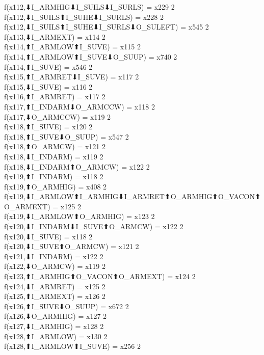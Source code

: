 f(x112,⬇I_ARMHIG⬇I_SUILS⬇I_SURLS) = x229 {2} \\
f(x112,⬇I_SUILS⬆I_SUHE⬇I_SURLS) = x228 {2} \\
f(x112,⬇I_SUILS⬆I_SUHE⬇I_SURLS⬇O_SULEFT) = x545 {2} \\
f(x113,⬇I_ARMEXT) = x114 {2} \\
f(x114,⬆I_ARMLOW⬆I_SUVE) = x115 {2} \\
f(x114,⬆I_ARMLOW⬆I_SUVE⬇O_SUUP) = x740 {2} \\
f(x114,⬆I_SUVE) = x546 {2} \\
f(x115,⬆I_ARMRET⬇I_SUVE) = x117 {2} \\
f(x115,⬇I_SUVE) = x116 {2} \\
f(x116,⬆I_ARMRET) = x117 {2} \\
f(x117,⬆I_INDARM⬇O_ARMCCW) = x118 {2} \\
f(x117,⬇O_ARMCCW) = x119 {2} \\
f(x118,⬆I_SUVE) = x120 {2} \\
f(x118,⬆I_SUVE⬇O_SUUP) = x547 {2} \\
f(x118,⬆O_ARMCW) = x121 {2} \\
f(x118,⬇I_INDARM) = x119 {2} \\
f(x118,⬇I_INDARM⬆O_ARMCW) = x122 {2} \\
f(x119,⬆I_INDARM) = x118 {2} \\
f(x119,⬆O_ARMHIG) = x408 {2} \\
f(x119,⬇I_ARMLOW⬆I_ARMHIG⬇I_ARMRET⬆O_ARMHIG⬆O_VACON⬆O_ARMEXT) = x125 {2} \\
f(x119,⬇I_ARMLOW⬆O_ARMHIG) = x123 {2} \\
f(x120,⬇I_INDARM⬇I_SUVE⬆O_ARMCW) = x122 {2} \\
f(x120,⬇I_SUVE) = x118 {2} \\
f(x120,⬇I_SUVE⬆O_ARMCW) = x121 {2} \\
f(x121,⬇I_INDARM) = x122 {2} \\
f(x122,⬇O_ARMCW) = x119 {2} \\
f(x123,⬆I_ARMHIG⬆O_VACON⬆O_ARMEXT) = x124 {2} \\
f(x124,⬇I_ARMRET) = x125 {2} \\
f(x125,⬆I_ARMEXT) = x126 {2} \\
f(x126,⬆I_SUVE⬇O_SUUP) = x672 {2} \\
f(x126,⬇O_ARMHIG) = x127 {2} \\
f(x127,⬇I_ARMHIG) = x128 {2} \\
f(x128,⬆I_ARMLOW) = x130 {2} \\
f(x128,⬆I_ARMLOW⬆I_SUVE) = x256 {2} \\
